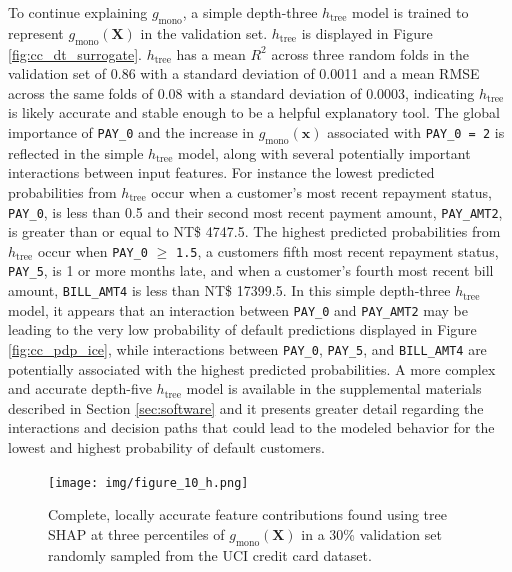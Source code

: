 \documentclass[sigconf, review]{acmart}
\begin{document}
To continue explaining $g_{\text{mono}}$, a simple depth-three $h_{\text{tree}}$ model is trained to represent  $g_{\text{mono}}(\mathbf{X})$ in the validation set. $h_{\text{tree}}$ is displayed in Figure \ref{fig:cc_dt_surrogate}. $h_{\text{tree}}$ has a mean $R^2$ across three random folds in the validation set of 0.86 with a standard deviation of 0.0011 and a mean RMSE across the same folds of 0.08 with a standard deviation of 0.0003, indicating $h_{\text{tree}}$ is likely accurate and stable enough to be a helpful explanatory tool. The global importance of \texttt{PAY\_0} and the increase in $g_{\text{mono}}(\mathbf{x})$ associated with \texttt{PAY\_0 = 2} is reflected in the simple $h_{\text{tree}}$ model, along with several potentially important interactions between input features. For instance the lowest predicted probabilities from $h_{\text{tree}}$ occur when a customer's  most recent repayment status, \texttt{PAY\_0}, is less than 0.5 and their second most recent payment amount, \texttt{PAY\_AMT2}, is greater than or equal to NT\$ 4747.5. The highest predicted probabilities from $h_{\text{tree}}$ occur when \texttt{PAY\_0} $\geq$ \texttt{1.5}, a customers fifth most recent repayment status, \texttt{PAY\_5}, is 1 or more months late, and when a customer's fourth most recent bill amount, \texttt{BILL\_AMT4} is less than NT\$ 17399.5. In this simple depth-three $h_{\text{tree}}$ model, it appears that an interaction between \texttt{PAY\_0} and \texttt{PAY\_AMT2} may be leading to the very low probability of default predictions displayed in Figure \ref{fig:cc_pdp_ice}, while interactions between \texttt{PAY\_0}, \texttt{PAY\_5}, and \texttt{BILL\_AMT4} are potentially associated with the highest predicted probabilities. A more complex and accurate depth-five $h_{\text{tree}}$ model is available in the supplemental materials described in Section \ref{sec:software} and it presents greater detail regarding the interactions and decision paths that could lead to the modeled behavior for the lowest and highest probability of default customers. 
 
\begin{figure}[htb]
	\begin{center}
		\texttt{[image: img/figure\_10\_h.png]}
		\caption{Complete, locally accurate feature contributions found using tree SHAP at three percentiles of $g_{\text{mono}}(\mathbf{X})$ in a 30\% validation set randomly sampled from the UCI credit card dataset.}
		\label{fig:cc_shap}
	\end{center}
\end{figure}
\end{document}
